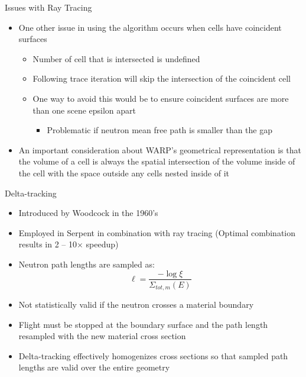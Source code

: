 \documentclass[xcolor=x11names, compress, handout]{beamer}
\renewcommand{\(}{\begin{columns}}
\renewcommand{\)}{\end{columns}}
\newcommand{\<}[1]{\begin{column}{#1}}
\renewcommand{\>}{\end{column}}
\begin{document}
\begin{frame}{Issues with Ray Tracing \cite{warp}}
	\begin{itemize}
	\item{One other issue in using the algorithm occurs when cells have coincident surfaces}
		\begin{itemize}
		\pause
		\item{Number of cell that is intersected is undefined}
		\pause
		\item{Following trace iteration will skip the intersection of the coincident cell}
		\pause
		\item{One way to avoid this would be to ensure coincident surfaces are more than one scene
		epsilon apart}
			\begin{itemize}
			\pause
			\item{Problematic if neutron mean free path is smaller than the gap}
			\end{itemize}
		\end{itemize}
	\pause
	\item{An important consideration about WARP's geometrical representation is that the volume of a
	cell is always the spatial intersection of the volume inside of the cell with the space outside
	any cells nested inside of it}
	\end{itemize}
\end{frame}


\begin{frame}{Delta-tracking}
	\begin{itemize}
	\item{Introduced by Woodcock in the 1960's}
	\pause
	\item{Employed in Serpent in combination with ray tracing \cite{serpent} (Optimal combination results in 2 -- 10$\times$ speedup)}
	\pause
	\item{Neutron path lengths are sampled as:}
		\begin{equation*}
		\ell = \frac{-\log\xi}{\Sigma_{tot,m}(E)}
		\end{equation*}
	\pause
	\item{Not statistically valid if the neutron crosses a material boundary}
	\pause
	\item{Flight must be stopped at the boundary surface and the path length resampled with the new 
	material cross section}
	\pause
	\item{Delta-tracking effectively homogenizes cross sections so that sampled path lengths are valid
	over the entire geometry}
	\end{itemize}
\end{frame}
\end{document}
